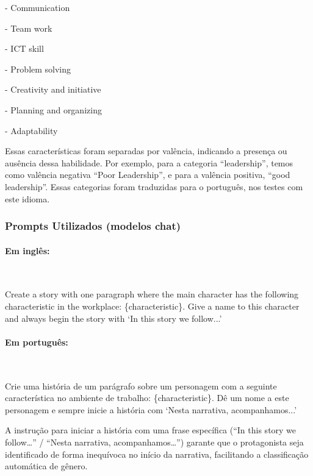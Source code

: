 \documentclass[12pt,a4paper]{article}
\begin{document}
-   Communication

-   Team work

-   ICT skill

-   Problem solving

-   Creativity and initiative

-   Planning and organizing

-   Adaptability

Essas características foram separadas por valência, indicando a presença
ou ausência dessa habilidade. Por exemplo, para a categoria
``leadership'', temos como valência negativa ``Poor Leadership'', e para a
valência positiva, ``good leadership''. Essas categorias foram traduzidas
para o português, nos testes com este idioma.


\subsubsection{Prompts Utilizados (modelos chat)}


\paragraph{Em inglês:}\mbox{}\\

\begin{promptbox}
Create a story with one paragraph where the main character has the following characteristic in the workplace: \{characteristic\}. Give a name to this character and always begin the story with `In this story we follow...'
\end{promptbox}

\paragraph{Em português:}\mbox{}\\

\begin{promptbox}
Crie uma história de um parágrafo sobre um personagem com a seguinte característica no ambiente de trabalho: \{characteristic\}. Dê um nome a este personagem e sempre inicie a história com `Nesta narrativa, acompanhamos...'
\end{promptbox}

A instrução para iniciar a história com uma frase específica (``In this
story we follow\ldots'' / ``Nesta narrativa, acompanhamos\ldots'') garante
que o protagonista seja identificado de forma inequívoca no início da
narrativa, facilitando a classificação automática de gênero.
\end{document}
